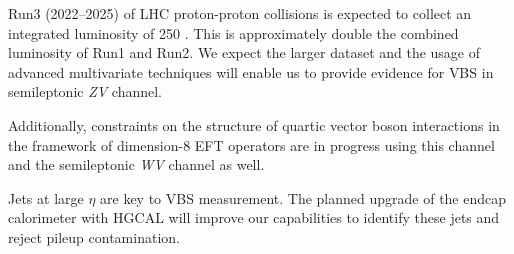 Run3 (2022--2025) of \gls{LHC}
proton-proton collisions is expected to
collect an integrated luminosity of 250 \fbinv{}.
This is approximately double the combined luminosity of Run1 and Run2.
We expect the larger
dataset and the usage of advanced multivariate techniques
will enable us to provide evidence for
\gls{VBS} in semileptonic \textit{ZV} channel.


Additionally, constraints on the structure of quartic vector boson interactions
in the framework of dimension-8 \gls{EFT} operators are in progress
using this channel and the semileptonic \textit{WV} channel as well.

Jets at large \( \eta \) are key to \gls{VBS} measurement.
The planned upgrade of the endcap calorimeter
with \gls{HGCAL} will improve our capabilities to identify these jets and
reject pileup contamination.